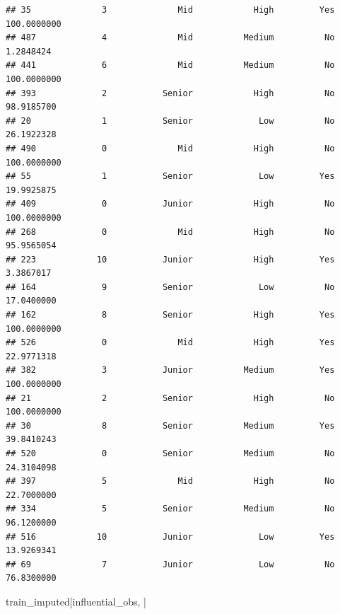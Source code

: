 \documentclass[
]{article}
\newenvironment{Shaded}{\begin{snugshade}}{\end{snugshade}}
\newcommand{\NormalTok}[1]{#1}
\begin{document}
\begin{verbatim}
## 35              3              Mid            High         Yes  100.0000000
## 487             4              Mid          Medium          No    1.2848424
## 441             6              Mid          Medium          No  100.0000000
## 393             2           Senior            High          No   98.9185700
## 20              1           Senior             Low          No   26.1922328
## 490             0              Mid            High          No  100.0000000
## 55              1           Senior             Low         Yes   19.9925875
## 409             0           Junior            High          No  100.0000000
## 268             0              Mid            High          No   95.9565054
## 223            10           Junior            High         Yes    3.3867017
## 164             9           Senior             Low          No   17.0400000
## 162             8           Senior            High         Yes  100.0000000
## 526             0              Mid            High         Yes   22.9771318
## 382             3           Junior          Medium         Yes  100.0000000
## 21              2           Senior            High          No  100.0000000
## 30              8           Senior          Medium         Yes   39.8410243
## 520             0           Senior          Medium          No   24.3104098
## 397             5              Mid            High          No   22.7000000
## 334             5           Senior          Medium          No   96.1200000
## 516            10           Junior             Low         Yes   13.9269341
## 69              7           Junior             Low          No   76.8300000
\end{verbatim}

\begin{Shaded}
\begin{Highlighting}[]
\NormalTok{train\_imputed[influential\_obs, ]}
\end{Highlighting}
\end{Shaded}
\end{document}
